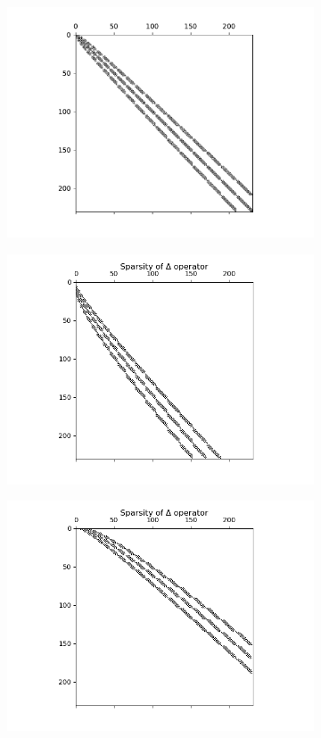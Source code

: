 \documentclass[11pt, oneside]{article}   	%
\begin{document}
\begin{figure}
	\begin{subfigure}[t]{0.45\textwidth}
	\includegraphics[scale=0.4]{sparsityoflaplacian-w11}
	\end{subfigure}
	\begin{subfigure}[t]{0.45\textwidth}
	\includegraphics[scale=0.4]{sparsityoflaplacian-w22}
	\end{subfigure}
	\begin{subfigure}[t]{0.45\textwidth}
	\includegraphics[scale=0.4]{sparsityoflaplacian-00}

\end{subfigure}
\end{figure}
\end{document}
